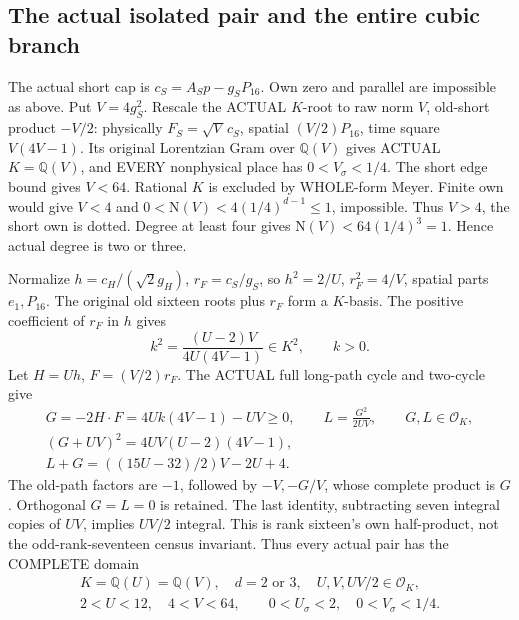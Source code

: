 \documentclass[11pt]{article}
\begin{document}
\subsection{The actual isolated pair and the entire cubic branch}
\label{app:arithB16cubic}

The actual short cap is
\(c_S=A_Sp-g_SP_{16}\).
Own zero and parallel are impossible as above.
Put \(V=4g_S^2\).
Rescale the ACTUAL \(K\)-root to raw norm \(V\),
old-short product \(-V/2\):
physically \(F_S=\sqrt V\,c_S\), spatial
\((V/2)P_{16}\), time square \(V(4V-1)\).
Its original Lorentzian Gram over \(\mathbb Q(V)\)
gives ACTUAL \(K=\mathbb Q(V)\), and EVERY
nonphysical place has \(0<V_\sigma<1/4\).
The short edge bound gives \(V<64\).
Rational \(K\) is excluded by WHOLE-form Meyer.
Finite own would give \(V<4\) and
\(0<\mathrm N(V)<4(1/4)^{d-1}\le1\), impossible.
Thus \(V>4\), the short own is dotted.
Degree at least four gives
\(\mathrm N(V)<64(1/4)^3=1\).
Hence actual degree is two or three.

Normalize \(h=c_H/(\sqrt2g_H)\),
\(r_F=c_S/g_S\), so
\(h^2=2/U\), \(r_F^2=4/V\), spatial parts
\(e_1,P_{16}\).
The original old sixteen roots plus \(r_F\)
form a \(K\)-basis.
The positive coefficient of \(r_F\) in \(h\) gives
\[
                   k^2={\frac{(U-2)V}{4U(4V-1)}}\in K^2,
                   \qquad k>0 .
\tag{B16K}\label{eq:arithB16square}
\]
Let \(H=Uh\), \(F=(V/2)r_F\).
The ACTUAL full long-path cycle and two-cycle give
\[
 \begin{gathered}
 G=-2H\cdot F=4Uk(4V-1)-UV\ge0,\qquad
 L={\frac{G^2}{2UV}},\qquad G,L\in\mathcal O_K,\\
 (G+UV)^2=4UV(U-2)(4V-1),\\
 L+G=((15U-32)/2)V-2U+4 .
 \end{gathered}
\tag{B16C}\label{eq:arithB16cycles}
\]
The old-path factors are \(-1\), followed by
\(-V,-G/V\), whose complete product is \(G\).
Orthogonal \(G=L=0\) is retained.
The last identity, subtracting seven integral
copies of \(UV\), implies \(UV/2\) integral.
This is rank sixteen's own half-product, not
the odd-rank-seventeen census invariant.
Thus every actual pair has the COMPLETE domain
\[
 \begin{gathered}
 K=\mathbb Q(U)=\mathbb Q(V),\quad d=2\text{ or }3,\quad
 U,V,UV/2\in\mathcal O_K,\\
 2<U<12,\quad4<V<64,\qquad
 0<U_\sigma<2,\quad0<V_\sigma<1/4 .
 \end{gathered}
\]
\end{document}
